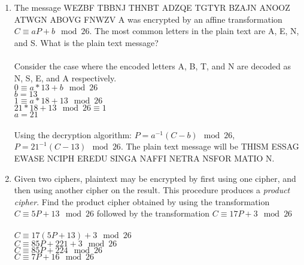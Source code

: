 \documentclass[]{article}
\begin{document}
\begin{enumerate}
    \item The message WEZBF TBBNJ THNBT ADZQE TGTYR BZAJN ANOOZ ATWGN ABOVG FNWZV A was encrypted by an affine transformation $C \equiv aP + b \mod 26$. The most common letters in the plain text are A, E, N, and S. What is the plain text message?
    \\\\Consider the case where the encoded letters A, B, T, and N are decoded as N, S, E, and A respectively.
    \\$0 \equiv a*13 + b \mod 26$
    \\$b=13$
    \\$1 \equiv a*18 + 13 \mod 26$
    \\$21*18+13 \mod 26 \equiv 1$
    \\$a=21$
    \\\\Using the decryption algorithm: $P=a^{-1}(C-b) \mod 26$, $P=21^{-1}(C-13) \mod 26$. The plain text message will be THISM ESSAG EWASE NCIPH EREDU SINGA NAFFI NETRA NSFOR MATIO N.

    \item Given two ciphers, plaintext may be encrypted by first using one cipher, and then using another cipher on the result. This procedure produces a \textit{product cipher}. Find the product cipher obtained by using the transformation $C \equiv 5P + 13 \mod 26$ followed by the transformation $C \equiv 17P + 3 \mod 26$
    \\\\$C \equiv 17(5P + 13) + 3 \mod 26$
    \\$C \equiv 85P + 221 +3 \mod 26$
    \\$C \equiv 85P + 224 \mod 26$
    \\$C \equiv 7P + 16 \mod 26$
    
    
\end{enumerate}
\end{document}
